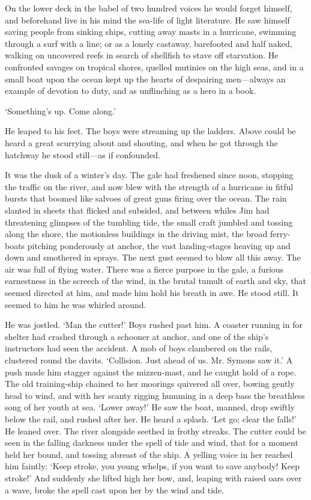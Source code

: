 On the lower deck in the babel of two hundred voices he would forget himself, and beforehand live in his mind the sea-life of light literature. He saw himself saving people from sinking ships, cutting away masts in a hurricane, swimming through a surf with a line; or as a lonely castaway, barefooted and half naked, walking on uncovered reefs in search of shellfish to stave off starvation. He confronted savages on tropical shores, quelled mutinies on the high seas, and in a small boat upon the ocean kept up the hearts of despairing men—always an example of devotion to duty, and as unflinching as a hero in a book.

‘Something’s up. Come along.’

He leaped to his feet. The boys were streaming up the ladders. Above could be heard a great scurrying about and shouting, and when he got through the hatchway he stood still—as if confounded.

It was the dusk of a winter’s day. The gale had freshened since noon, stopping the traffic on the river, and now blew with the strength of a hurricane in fitful bursts that boomed like salvoes of great guns firing over the ocean. The rain slanted in sheets that flicked and subsided, and between whiles Jim had threatening glimpses of the tumbling tide, the small craft jumbled and tossing along the shore, the motionless buildings in the driving mist, the broad ferry-boats pitching ponderously at anchor, the vast landing-stages heaving up and down and smothered in sprays. The next gust seemed to blow all this away. The air was full of flying water. There was a fierce purpose in the gale, a furious earnestness in the screech of the wind, in the brutal tumult of earth and sky, that seemed directed at him, and made him hold his breath in awe. He stood still. It seemed to him he was whirled around.

He was jostled. ‘Man the cutter!’ Boys rushed past him. A coaster running in for shelter had crashed through a schooner at anchor, and one of the ship’s instructors had seen the accident. A mob of boys clambered on the rails, clustered round the davits. ‘Collision. Just ahead of us. Mr. Symons saw it.’ A push made him stagger against the mizzen-mast, and he caught hold of a rope. The old training-ship chained to her moorings quivered all over, bowing gently head to wind, and with her scanty rigging humming in a deep bass the breathless song of her youth at sea. ‘Lower away!’ He saw the boat, manned, drop swiftly below the rail, and rushed after her. He heard a splash. ‘Let go; clear the falls!’ He leaned over. The river alongside seethed in frothy streaks. The cutter could be seen in the falling darkness under the spell of tide and wind, that for a moment held her bound, and tossing abreast of the ship. A yelling voice in her reached him faintly: ‘Keep stroke, you young whelps, if you want to save anybody! Keep stroke!’ And suddenly she lifted high her bow, and, leaping with raised oars over a wave, broke the spell cast upon her by the wind and tide.


